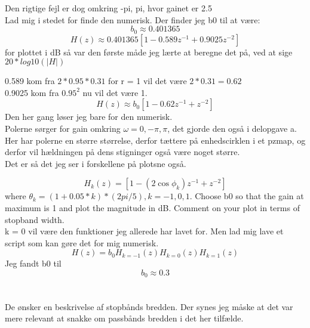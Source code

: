 \begin{Opgaver}
\begin{kapitel}
\begin{Opgave}
\begin{UnderOpgave}
                Den rigtige fejl er dog omkring -pi, pi, hvor gainet er 2.5\\
                Lad mig i stedet for finde den numerisk. 
                Der finder jeg b0 til at være: 
                \[b_0 \approx 0.401365\]
                \[H(z)\approx 0.401365 [1-0.589z^{-1}+0.9025z^{-2}]\]
                for plottet i dB så var den første måde jeg lærte at beregne det på, ved at sige $20*log10(|H|)$
                \\    
            \end{UnderOpgave}
            \begin{UnderOpgave}[Repeat part (a) using r =1. Comment on your results.]
                0.589 kom fra $2 * 0.95 * 0.31$ for r = 1 vil det være $2 * 0.31 = 0.62$\\
                0.9025 kom fra $0.95^2$ nu vil det være 1. 
                \[H(z)\approx b_{0}[1 - 0.62z^{-1} + z^{-2}]\]
                Den her gang løser jeg bare for den numerisk.
                \\
                Polerne sørger for gain omkring $\omega = 0, -\pi, \pi$, det gjorde den også i delopgave a.\\
                Her har polerne en større størrelse, derfor tættere på enhedscirklen i et pzmap, og derfor vil hældningen på dens stigninger også være noget større. \\
                Det er så det jeg ser i forskellene på plotsne også. 
            \end{UnderOpgave}
            \begin{UnderOpgave}[Now consider a cascade of 3 FIR notch filters, \text{$H(z)=b_{0}\prod_{k=-1}^{1}H_k(z)$} of the form]
                \[H_{k}(z)=[1-(2\cos\phi_{k})z^{-1}+z^{-2}]\]
                where $\theta_k = (1 +0.05*k)*(2pi/5), k = -1, 0, 1$. Choose b0 so that the gain at maximum is 1 and plot the magnitude in dB. 
                Comment on your plot in terms of stopband width.\\
                k = 0 vil være den funktioner jeg allerede har lavet for. Men lad mig lave et script som kan gøre det for mig numerisk. 
                \[H(z) = b_0H_{k=-1}(z)H_{k=0}(z)H_{k=1}(z)\]
                Jeg fandt b0 til
                \[b_0 \approx 0.3\]
                \\\\
                De ønsker en beskrivelse af stopbånds bredden. Der synes jeg måske at det var mere relevant at snakke om passbånds bredden i det her tilfælde. 

\end{UnderOpgave}
\end{Opgave}
\end{kapitel}
\end{Opgaver}
